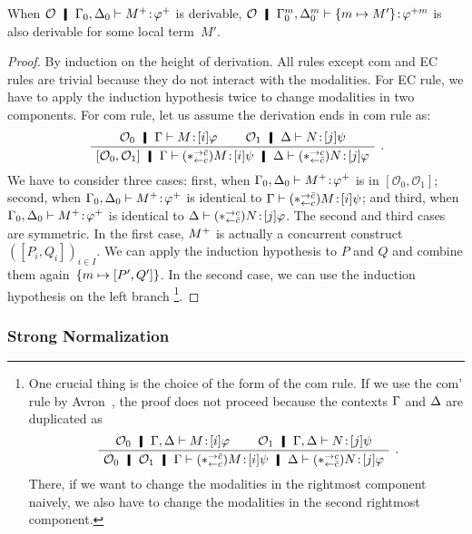   \begin{proposition}
   \label{process-change}
  When $\mathcal O \hmid \G_0,\D_0\tr\tj{\m{M}}{\m\phi}$ is derivable,
  $\mathcal O\hmid \G_0^m, \D_0^m\tr\tj{\mmapsto{M'}}{\phi^{+m}}$ is also
  derivable for some local term~$M'$.
  \end{proposition}
  \begin{proof}
   By induction on the height of derivation.
   All rules except com and EC rules are trivial because
   they do not interact
   with the modalities.  For EC rule, we have to apply the induction
   hypothesis twice to change modalities in two components.
   For com rule, let us assume the derivation ends in com rule as:
   \[
   \BinaryRule
   {$\hypert_0\hmid\G\tr\tj{M}{[i]\varphi}$}
   {$\hypert_1\hmid\D\tr\tj{N}{[j]\psi}$}
   {}
   {$\cotuple{\hypert_0,\hypert_1}\hmid\Gamma\tr\tj{(\comodL)M}{[i]\psi}\hmid
   \Delta\tr\tj{(\comodR)N}{[j]\varphi}$}\enspace.
   \]
   We have to consider three cases:  first, when
   $\Gamma_0,\Delta_0\vdash{{M}^+} \mathord{\colon\kern -2pt}{{\varphi}^+}$ is in $[\mathcal O_0, \mathcal O_1]$;
   second, when $\Gamma_0,\Delta_0\vdash{{M}^+} \mathord{\colon\kern -2pt}{{\varphi}^+}$ is identical to
   $\Gamma\vdash{(\ast^{\rightarrow {\bar{c}}}_{\leftarrow{c}})M} \mathord{\colon\kern -2pt}{[i]\psi} $; and third,
   when $\Gamma_0,\Delta_0\vdash{{M}^+} \mathord{\colon\kern -2pt}{{\varphi}^+}$ is identical to
   $\Delta\vdash{(\ast^{\rightarrow {c}}_{\leftarrow{\bar{c}}})N} \mathord{\colon\kern -2pt}{[j]\varphi}$.
   The second and third cases are symmetric.  In the first case, ${M}^+$ is
   actually a concurrent construct $([P_i,Q_i])_{i\in I}$. We can apply the
   induction hypothesis to $P$ and $Q$ and combine them
   again~$\{m\mapsto {[{P', Q'}]}\}$.
   In the second case, we can use the induction hypothesis on the left branch%
   \footnote{One crucial thing is the choice of the form of the com rule.
   If we use the com' rule by Avron~\cite{avron91}, the proof does not
   proceed because the contexts $\Gamma$ and $\Delta$ are duplicated as
   \[
   \BinaryRule
   {$\hypert_0\hmid\G,\D\tr\tj{M}{[i]\varphi}$}
   {$\hypert_1\hmid\G,\D\tr\tj{N}{[j]\psi}$}
   {}
   {$\hypert_0\hmid\hypert_1\hmid\G\tr\tj{(\comodL)M}{[i]\psi}\hmid
   \D\tr\tj{(\comodR)N}{[j]\varphi}$}\enspace.
   \]
   There, if we want to change the modalities in the rightmost component
   naively, we also have to change the modalities in the second
   rightmost component.
   }.
  \end{proof}

\subsubsection{Strong Normalization}
\newcommand{\sreduce}{\leadsto}

